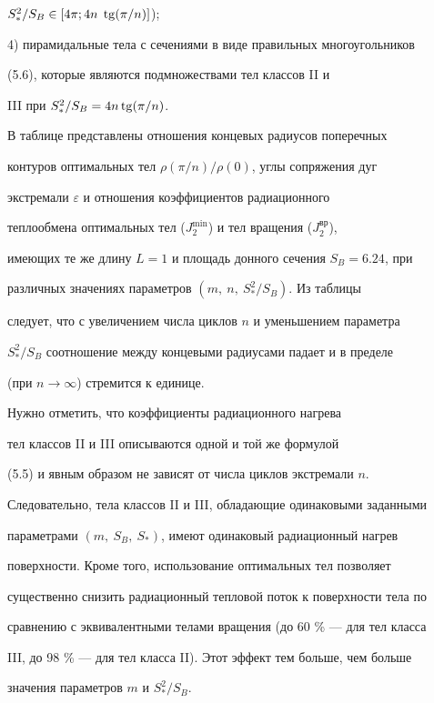 $S^2_* / S_B \in [ 4 \pi; 4n \; \operatorname{tg} ( \pi / n )]$);





4) пирамидальные тела с сечениями в виде правильных многоугольников


(5.6), которые являются подмножествами тел классов II и


III при $S^2_* / S_B = 4 n  \operatorname{tg} (\pi / n )$.





В таблице представлены отношения концевых радиусов поперечных


контуров оптимальных тел $\rho(\pi/n) / \rho(0)$, углы сопряжения дуг


экстремали $\varepsilon$ и отношения коэффициентов радиационного


теплообмена оптимальных тел ($J_2^{\min}$) и тел вращения ($J_2^{\text{вр}}$),


имеющих те же длину $L=1$ и площадь донного сечения $S_B= 6.24 $, при


различных значениях параметров $(m,\ n,\ S_*^2 / S_B)$. Из таблицы


следует, что с увеличением числа циклов $n$ и уменьшением параметра


$S_*^2 / S_B$ соотношение между концевыми радиусами падает и в пределе


(при $n \to \infty$) стремится к единице.





Нужно отметить, что коэффициенты радиационного нагрева


тел классов II и III описываются одной и той же формулой


(5.5) и явным образом не зависят от числа циклов экстремали $n$.


Следовательно, тела классов II и III, обладающие одинаковыми заданными


параметрами $(m,\ S_B,\ S_*)$, имеют одинаковый радиационный нагрев


поверхности. Кроме того, использование оптимальных тел позволяет


существенно снизить радиационный тепловой поток к поверхности тела по


сравнению с эквивалентными телами вращения (до 60 \% --- для тел класса


III, до 98 \% --- для тел класса II). Этот эффект тем больше, чем больше


значения параметров $m$ и $S^2_* / S_B$.





